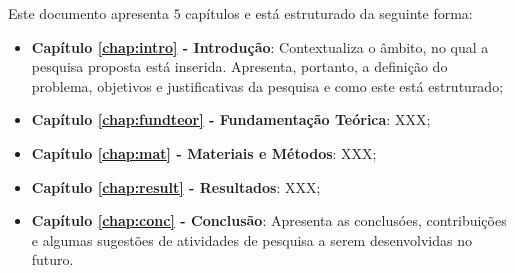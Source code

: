 Este documento apresenta $5$ capítulos e está estruturado da seguinte forma:

\begin{itemize}

  \item \textbf{Capítulo \ref{chap:intro} - Introdução}: Contextualiza o âmbito, no qual a pesquisa proposta está inserida. Apresenta, portanto, a definição do problema, objetivos e justificativas da pesquisa e como este \thetypeworkthree está estruturado;
  \item \textbf{Capítulo \ref{chap:fundteor} - Fundamentação Teórica}: XXX;
  \item \textbf{Capítulo \ref{chap:mat} - Materiais e Métodos}: XXX;
  \item \textbf{Capítulo \ref{chap:result} - Resultados}: XXX;
  \item \textbf{Capítulo \ref{chap:conc} - Conclusão}: Apresenta as conclusóes, contribuições e algumas sugestões de atividades de pesquisa a serem desenvolvidas no futuro.

\end{itemize}
